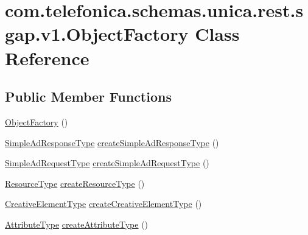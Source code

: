 \hypertarget{classcom_1_1telefonica_1_1schemas_1_1unica_1_1rest_1_1sgap_1_1v1_1_1ObjectFactory}{
\section{com.telefonica.schemas.unica.rest.sgap.v1.ObjectFactory Class Reference}
\label{classcom_1_1telefonica_1_1schemas_1_1unica_1_1rest_1_1sgap_1_1v1_1_1ObjectFactory}
}
\subsection*{Public Member Functions}
\begin{DoxyCompactItemize}
\item 
\hyperlink{classcom_1_1telefonica_1_1schemas_1_1unica_1_1rest_1_1sgap_1_1v1_1_1ObjectFactory_ae7c0e0dfee0d21c0902738e3c2f39f36}{ObjectFactory} ()
\item 
\hyperlink{classcom_1_1telefonica_1_1schemas_1_1unica_1_1rest_1_1sgap_1_1v1_1_1SimpleAdResponseType}{SimpleAdResponseType} \hyperlink{classcom_1_1telefonica_1_1schemas_1_1unica_1_1rest_1_1sgap_1_1v1_1_1ObjectFactory_a9506c217a8dbbdced69f57afa3bf8164}{createSimpleAdResponseType} ()
\item 
\hyperlink{classcom_1_1telefonica_1_1schemas_1_1unica_1_1rest_1_1sgap_1_1v1_1_1SimpleAdRequestType}{SimpleAdRequestType} \hyperlink{classcom_1_1telefonica_1_1schemas_1_1unica_1_1rest_1_1sgap_1_1v1_1_1ObjectFactory_a37b07ddf0fb15e2f9945d9cb8135692d}{createSimpleAdRequestType} ()
\item 
\hyperlink{classcom_1_1telefonica_1_1schemas_1_1unica_1_1rest_1_1sgap_1_1v1_1_1ResourceType}{ResourceType} \hyperlink{classcom_1_1telefonica_1_1schemas_1_1unica_1_1rest_1_1sgap_1_1v1_1_1ObjectFactory_aacd6fc84a2d129f7f5c473be48720640}{createResourceType} ()
\item 
\hyperlink{classcom_1_1telefonica_1_1schemas_1_1unica_1_1rest_1_1sgap_1_1v1_1_1CreativeElementType}{CreativeElementType} \hyperlink{classcom_1_1telefonica_1_1schemas_1_1unica_1_1rest_1_1sgap_1_1v1_1_1ObjectFactory_a67a85cd3e158ceeb34c35c39d58a1c14}{createCreativeElementType} ()
\item 
\hyperlink{classcom_1_1telefonica_1_1schemas_1_1unica_1_1rest_1_1sgap_1_1v1_1_1AttributeType}{AttributeType} \hyperlink{classcom_1_1telefonica_1_1schemas_1_1unica_1_1rest_1_1sgap_1_1v1_1_1ObjectFactory_ace9ea2703e749feb09ff1a2f65d26406}{createAttributeType} ()

\end{DoxyCompactItemize}
